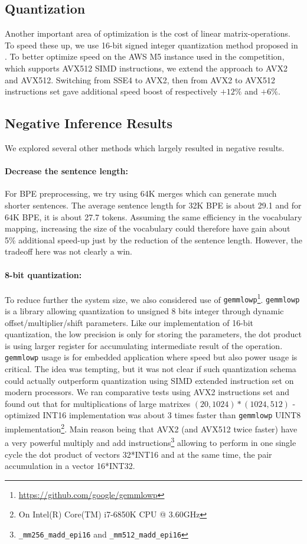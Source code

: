 \documentclass[11pt,a4paper]{article}
\begin{document}
\subsection{Quantization}
\label{quantize}
Another important area of optimization is the cost of linear
matrix-operations.  To speed these up, we use 16-bit signed integer
quantization method proposed in .
To better optimize speed on the AWS M5 instance used in the
competition, which supports AVX512 SIMD instructions, we extend the
approach to AVX2 and AVX512. Switching from SSE4 to AVX2, then from
AVX2 to AVX512 instructions set gave additional speed boost of
respectively $+12\%$ and $+6\%$.

\subsection{Negative Inference Results}
We explored several other methods which largely resulted in
negative results.

\paragraph{Decrease the sentence length:}
For BPE preprocessing, we try using 64K merges which can generate much shorter sentences.
The average sentence length for 32K BPE is about 29.1 and for 64K BPE, it is about 27.7 tokens. Assuming the same efficiency in the vocabulary mapping, increasing the size of the vocabulary could therefore have gain about 5\% additional speed-up just by the reduction of the sentence length. However, the tradeoff here was not clearly a win.

 \paragraph{8-bit quantization:}
To reduce further the system size, we also considered use of {\tt gemmlowp}\footnote{\url{https://github.com/google/gemmlowp}}. {\tt gemmlowp} is a library allowing quantization to unsigned 8 bits integer through dynamic offset/multiplier/shift parameters. Like our implementation of 16-bit quantization, the low precision is only for storing the parameters, the dot product is using larger register for accumulating intermediate result of the operation. {\tt gemmlowp} usage is for embedded application where speed but also power usage is critical. The idea was tempting, but it was not clear if such quantization schema could actually outperform quantization using SIMD extended instruction set on modern processors. We ran  comparative tests using AVX2 instructions set and found out that for multiplications of large matrixes $(20,1024) * (1024,512)$ - optimized INT16 implementation was about 3 times faster than  {\tt gemmlowp} UINT8 implementation\footnote{On Intel(R) Core(TM) i7-6850K CPU @ 3.60GHz}. Main reason being that AVX2 (and AVX512 twice faster) have a very powerful multiply and add instructions\footnote{{\tt \_mm256\_madd\_epi16} and {\tt \_mm512\_madd\_epi16}} allowing to perform in one single cycle the dot product of vectors 32*INT16 and at the same time, the pair accumulation in a vector 16*INT32.
\end{document}
